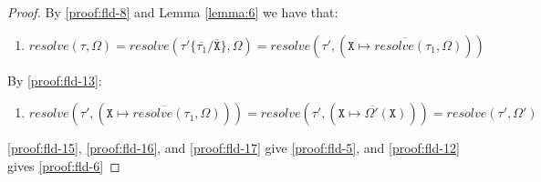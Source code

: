 \begin{proof}
By \ref{proof:fld-8} and Lemma \ref{lemma:6} we have that:
\begin{enumerate}[label=\arabic*), resume]
    \item \label{proof:fld-16} $resolve(\tau, \Omega) = resolve(\tau'\{\overline{\tau_1}/\overline{\texttt{X}}\}, \Omega) = resolve(\tau', (\overline{\texttt{X} \mapsto resolve(\tau_1, \Omega)}))$
\end{enumerate}
By \ref{proof:fld-13}:
\begin{enumerate}[label=\arabic*), resume]
    \item \label{proof:fld-17} $resolve(\tau', (\overline{\texttt{X} \mapsto resolve(\tau_1, \Omega)})) = resolve(\tau', (\overline{\texttt{X} \mapsto \Omega'(\texttt{X})})) = resolve(\tau', \Omega')$
\end{enumerate}
\ref{proof:fld-15}, \ref{proof:fld-16}, and \ref{proof:fld-17} give \ref{proof:fld-5}, and \ref{proof:fld-12} gives \ref{proof:fld-6}
\end{proof}

